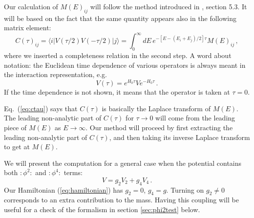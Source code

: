 \documentclass[11pt]{article}
\newcommand{\reef}[1]{(\ref{#1})}
\newcommand{\beq}{\begin{equation}}
\newcommand{\eeq}{\end{equation}}
\newcommand{\ket}[1]{|#1\rangle}
\newcommand{\bra}[1]{\langle #1|}
\numberwithin{equation}{section}
\begin{document}
Our calculation of $M(E)_{ij}$ will follow the method introduced in \cite{Hogervorst:2014rta}, section 5.3. It will be based on the fact that the same quantity appears also in the following matrix element:
%
\begin{equation}
\label{eq:ctau}
C(\tau)_{ij}= \bra{i} V(\tau/2) V(-\tau/2)\ket{j} = \int_0^\infty dE\, e^{-\left[ E -\left(E_i+E_j\right)/2\right] \tau} M(E)_{ij}\,,
\end{equation}
%
where we inserted a completeness relation in the second step. A word about notation: the Euclidean time dependence of various operators is always meant in the interaction representation, e.g.
\beq
V(\tau)=e^{H_0\tau} V e^{-H_0\tau}\,.
\eeq
If the time dependence is not shown, it means that the operator is taken at $\tau=0$.

Eq.~(\ref{eq:ctau}) says that $C(\tau)$ is basically the Laplace transform of $M(E)$. The leading non-analytic part of $C(\tau)$ for $\tau \to 0$ will come from the leading piece of $M(E)$ as $E \to \infty$. Our method will proceed by first extracting the leading non-analytic part of $C(\tau)$, and then taking its inverse Laplace transform to get at $M(E)$.

We will present the computation for a general case when the potential contains both $:\phi^2:$ and $:\phi^4:$ terms:
\beq
\label{eq:Vgen}
V= g_2 V_2+g_4 V_4 \,.
\eeq
Our Hamiltonian \reef{eq:hamiltonian} has $g_2=0$, $g_4=g$. Turning on $g_2\ne0$ corresponds to an extra contribution to the mass. Having this coupling will be useful for a check of the formalism in section \ref{sec:phi2test} below. 
\end{document}
